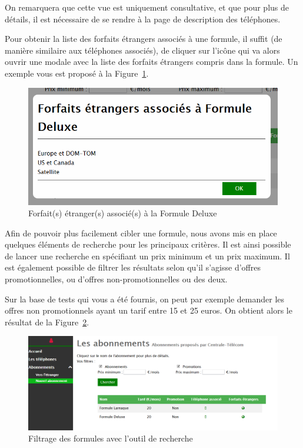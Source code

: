 On remarquera que cette vue est uniquement consultative, et que pour plus de détails, il est nécessaire de se rendre à la page de description des téléphones.

Pour obtenir la liste des forfaits étrangers associés à une formule, il suffit (de manière similaire aux téléphones associés), de cliquer sur l'icône \faGlobe{} qui va alors ouvrir une modale avec la liste des forfaits étrangers compris dans la formule. Un exemple vous est proposé à la Figure~\ref{fig:foreign-associes}.

\begin{figure}[ht]
  \centering
  \includegraphics[width=.5\textwidth]{images/Plateforme/foreign_associes}
  \caption{Forfait(s) étranger(s) associé(s) à la \og Formule Deluxe\fg}
  \label{fig:foreign-associes}
\end{figure}

Afin de pouvoir plus facilement cibler une formule, nous avons mis en place quelques éléments de recherche pour les principaux critères. Il est ainsi possible de lancer une recherche en spécifiant un prix minimum et un prix maximum. Il est également possible de filtrer les résultats selon qu'il s'agisse d'offres promotionnelles, ou d'offres non-promotionnelles ou des deux.

Sur la base de tests qui vous a été fournis, on peut par exemple demander les offres non promotionnels ayant un tarif entre 15 et 25 euros. On obtient alors le résultat de la Figure~\ref{fig:filtrage-resultats}.

\begin{figure}[ht]
  \centering
  \includegraphics[width=.7\textwidth]{images/Plateforme/filtrage-resultats}
  \caption{Filtrage des formules avec l'outil de recherche}
  \label{fig:filtrage-resultats}
\end{figure}

